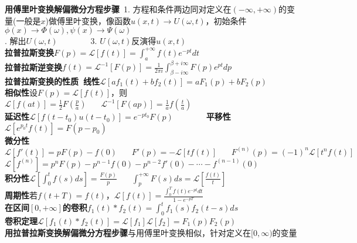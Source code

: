 \documentclass[10pt,a4paper]{article}
\begin{document}
\begin{multicols}{2}
\textbf{用傅里叶变换解偏微分方程步骤}~1. 方程和条件两边同对定义在$(-\infty,+\infty)$的变量(一般是$x$)做傅里叶变换，像函数$u(x,t)\to U(\omega,t)$，初始条件$\phi(x)\to\Phi(\omega),\psi(x)\to\Psi(\omega)$\\
. 解出$U(\omega,t)$~~~~~~~~3. $U(\omega,t)$反演得$u(x,t)$\\
\textbf{拉普拉斯变换}$F(p)=\mathcal{L}[f(t)]=\int_a^{+\infty}f(t)e^{-pt}dt$\\
\textbf{拉普拉斯逆变换}$f(t)=\mathcal{L}^{-1}[F(p)]=\frac{1}{2\pi i}\int_{\beta-i\infty}^{\beta+i\infty}F(p)e^{pt}dp$\\
\textbf{拉普拉斯变换的性质~线性}$\mathcal{L}[af_1(t)+bf_2(t)]=aF_1(p)+bF_2(p)$\\
\indent\textbf{相似性}设$F(p)=\mathcal{L}[f(t)]$，则$\mathcal{L}[f(at)]=\frac{1}{2}F(\frac{p}{a})~~~~~~~~\mathcal{L}^{-1}[F(ap)]=\frac{1}{a}f(\frac{t}{a})$\\
\indent\textbf{延迟性}$\mathcal{L}[f(t-t_0)u(t-t_0)]=e^{-pt_0}F(p)$~~~~~~~~\textbf{平移性}$\mathcal{L}[e^{p_0t}f(t)]=F(p-p_0)$\\
\indent\textbf{微分性}$\mathcal{L}[f'(t)]=pF(p)-f(0)~~~~~~~~F'(p)=-\mathcal{L}[tf(t)]~~~~~~~~F^{(n)}(p)=(-1)^n\mathcal{L}[t^nf(t)]$\\
\indent\indent$\mathcal{L}[f^{(n)}]=p^nF(p)-p^{n-1}f(0)-p^{n-2}f'(0)-\cdots-f^{(n-1)}(0)$\\
\indent\textbf{积分性}$\mathcal{L}[\int_0^tf(s)ds]=\frac{F(p)}{p}~~~~~~~~\int_p^{+\infty}F(s)ds=\mathcal{L}[\frac{f(t)}{t}]$\\
\indent\textbf{周期性}若$f(t+T)=f(t)$，$\mathcal{L}[f(t)]=\frac{\int_0^Tf(t)e^{-pt}dt}{1-e^{-pT}}$\\
\indent\textbf{在区间$[0,+\infty]$的卷积}$f_1(t)*f_2(t)=\int_0^tf_1(s)f_2(t-s)ds$\\
\indent\textbf{卷积定理}$\mathcal{L}[f_1(t)*f_2(t)]=\mathcal{L}[f_1]\mathcal{L}[f_2]=F_1(p)F_2(p)$\\
\textbf{用拉普拉斯变换解偏微分方程步骤}与用傅里叶变换相似，针对定义在$[0,\infty)$的变量
\end{multicols}
\end{document}
